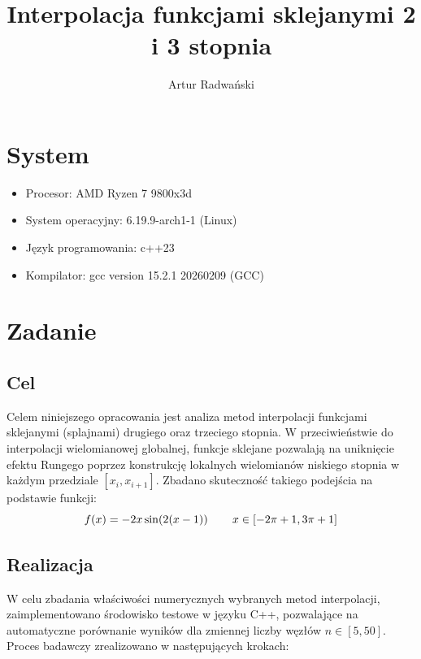 \documentclass{article}
\author{Artur Radwański}
\title{Interpolacja funkcjami sklejanymi 2 i 3 stopnia}
\begin{document}
\maketitle


\linespread{1.3}
\selectfont

\section{System}
\begin{itemize}
    \item Procesor: AMD Ryzen 7 9800x3d
    \item System operacyjny: 6.19.9-arch1-1 (Linux)
    \item Język programowania: c++23
    \item Kompilator: gcc version 15.2.1 20260209 (GCC) 
\end{itemize}


\section{Zadanie}
\subsection{Cel}
Celem niniejszego opracowania jest analiza metod interpolacji funkcjami sklejanymi (splajnami) drugiego oraz trzeciego stopnia. W przeciwieństwie do
interpolacji wielomianowej globalnej, funkcje sklejane pozwalają na uniknięcie efektu Rungego poprzez konstrukcję lokalnych wielomianów niskiego stopnia w
każdym przedziale $[x_i, x_{i+1}]$. Zbadano skuteczność takiego podejścia na podstawie funkcji:
\[f(x) = -2x\sin(2(x-1))\hspace{5ex}  x\in[-2\pi+1,3\pi+1]\]



\subsection{Realizacja}

W celu zbadania właściwości numerycznych wybranych metod interpolacji, zaimplementowano środowisko testowe w języku C++, pozwalające na automatyczne porównanie
wyników dla zmiennej liczby węzłów $n \in [5, 50]$. Proces badawczy zrealizowano w następujących krokach:
\end{document}
